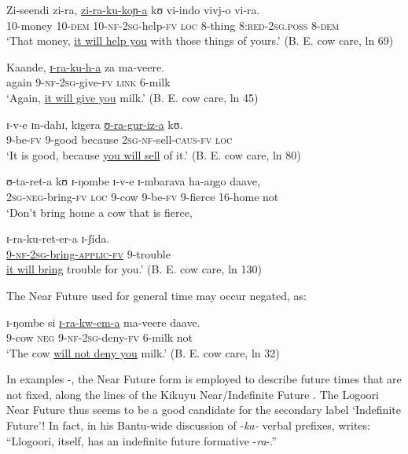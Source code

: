 \documentclass[output=paper]{langsci/langscibook}
\begin{document}
\ea\label{ex:sarvasy:4}
\gll Zi-seendi   zi-ra,     \underline{zi-ra-ku-koɲ-a}   kʊ   vi-indo   vivj-o       vi-ra. \\
10-money  10-\textsc{dem}  10-\textsc{nf-2sg}{}-help-\textsc{fv}  \textsc{loc}  8-thing  8:\textsc{red-2sg.poss}  8-\textsc{dem} \\
\glt ‘That money, \underline{it will help you} with those things of yours.’ (B. E. cow care, ln 69)
\z

\ea\label{ex:sarvasy:5}
\gll Kaande,   \underline{ɪ{}-ra-ku-h-a}     za   ma-veere. \\
again  9-\textsc{nf-2sg}{}-give-\textsc{fv} \textsc{link}  6-milk \\
\glt ‘Again, \underline{it will give you} milk.’ (B. E. cow care, ln 45)
\z

\ea\label{ex:sarvasy:6}
\gll ɪ{}-v-e   ɪn-dahɪ,   kɪgera   \underline{ʊ{}-ra-gur-iz-a}       kʊ. \\
9-be-\textsc{fv}  9-good  because  \textsc{2sg-nf}{}-sell-\textsc{caus-fv}  \textsc{loc} \\
\glt ‘It is good, because \underline{you will sell} of it.’ (B. E. cow care, ln 80)
\z 

\ea\label{ex:sarvasy:7}
\gll ʊ{}-ta-ret-a     kʊ   ɪ{}-ŋombe   ɪ{}-v-e     ɪ{}-mbarava   ha-aŋgo   daave, \\ 
\textsc{2sg-neg}{}-bring-\textsc{fv}  \textsc{loc}  9-cow    9-be-\textsc{fv}  9-fierce  16-home  not \\ 
\glt ‘Don’t bring home a cow that is fierce, 

\gll ɪ{}-ra-ku-ret-er-a     ɪ{}-ʃ\'{i}da. \\
\underline{9-\textsc{nf-2sg-}bring-\textsc{applic-fv}} 9-trouble \\
\glt \underline{it will bring} trouble for you.’ (B. E. cow care, ln 130)
\z 

The Near Future used for general time may occur negated, as:

\ea\label{ex:sarvasy:8}
\gll ɪ{}-ŋombe   si  \underline{ɪ{}-ra-kw-em-a}   ma-veere   daave. \\
9-cow  \textsc{neg}  \textsc{9-nf-2sg}{}-deny-\textsc{fv}  6-milk    not \\
\glt ‘The cow \underline{will not deny you} milk.’ (B. E. cow care, ln 32)
\z

In examples -, the Near Future form is employed to describe future times that are not fixed, along the lines of the Kikuyu Near/Indefinite Future \citep[20]{Johnson1977}. The Logoori Near Future thus seems to be a good candidate for the secondary label ‘Indefinite Future’! In fact, in his Bantu-wide discussion of -\textit{ka- }verbal prefixes, \citet[492]{Botne1999} writes: “Llogoori, itself, has an indefinite future formative -\textit{ra}{}-.” 
\end{document}
